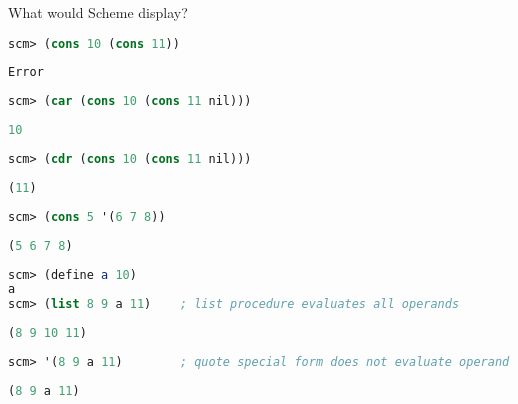 \question What would Scheme display?

\begin{lstlisting}[language=Scheme]
scm> (cons 10 (cons 11))
\end{lstlisting}
\begin{solution}[0.15in]
\begin{lstlisting}[language=Scheme]
Error
\end{lstlisting}
\end{solution}

\begin{lstlisting}[language=Scheme]
scm> (car (cons 10 (cons 11 nil)))
\end{lstlisting}
\begin{solution}[0.15in]
\begin{lstlisting}[language=Scheme]
10
\end{lstlisting}
\end{solution}

\begin{lstlisting}[language=Scheme]
scm> (cdr (cons 10 (cons 11 nil)))
\end{lstlisting}
\begin{solution}[0.15in]
\begin{lstlisting}[language=Scheme]
(11)
\end{lstlisting}
\end{solution}

\begin{lstlisting}[language=Scheme]
scm> (cons 5 '(6 7 8))
\end{lstlisting}
\begin{solution}[0.15in]
\begin{lstlisting}[language=Scheme]
(5 6 7 8)
\end{lstlisting}
\end{solution}

\begin{lstlisting}[language=Scheme]
scm> (define a 10)
a
scm> (list 8 9 a 11)    ; list procedure evaluates all operands
\end{lstlisting}
\begin{solution}[0.15in]
\begin{lstlisting}[language=Scheme]
(8 9 10 11)
\end{lstlisting}
\end{solution}

\begin{lstlisting}[language=Scheme]
scm> '(8 9 a 11)        ; quote special form does not evaluate operand
\end{lstlisting}
\begin{solution}[0.15in]
\begin{lstlisting}[language=Scheme]
(8 9 a 11)
\end{lstlisting}
\end{solution}

